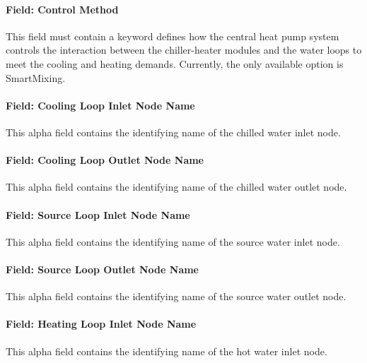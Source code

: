 \paragraph{Field: Control Method}\label{field-control-method}

This field must contain a keyword defines how the central heat pump system controls the interaction between the chiller-heater modules and the water loops to meet the cooling and heating demands. Currently, the only available option is SmartMixing.

\paragraph{Field: Cooling Loop Inlet Node Name}\label{field-cooling-loop-inlet-node-name}

This alpha field contains the identifying name of the chilled water inlet node.

\paragraph{Field: Cooling Loop Outlet Node Name}\label{field-cooling-loop-outlet-node-name}

This alpha field contains the identifying name of the chilled water outlet node.

\paragraph{Field: Source Loop Inlet Node Name}\label{field-source-loop-inlet-node-name}

This alpha field contains the identifying name of the source water inlet node.

\paragraph{Field: Source Loop Outlet Node Name}\label{field-source-loop-outlet-node-name}

This alpha field contains the identifying name of the source water outlet node.

\paragraph{Field: Heating Loop Inlet Node Name}\label{field-heating-loop-inlet-node-name}

This alpha field contains the identifying name of the hot water inlet node.

